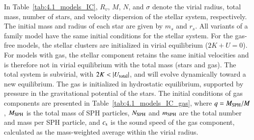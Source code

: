 In Table~\ref{tab:4.1_models_IC}, $R_v$, $M$, $N$, and $\sigma$ denote the virial radius, total mass, number of stars, and velocity dispersion of the stellar system, respectively. The initial mass and radius of each star are given by $m_s$ and $r_s$. All variants of a family model have the same initial conditions for the stellar system. For the gas-free models, the stellar clusters are initialized in virial equilibrium ($2K + U = 0$). For models with gas, the stellar component retains the same initial velocities and is therefore not in virial equilibrium with the total mass (stars and gas). The total system is subvirial, with $2K<|U_{\rm total}|$, and will evolve dynamically toward a new equilibrium. The gas is initialized in hydrostatic equilibrium, supported by pressure in the gravitational potential of the stars. The initial conditions of gas components are presented in Table~\ref{tab:4.1_models_IC_gas}, where $q=M_{\rm SPH}/M$, $M_{\rm SPH}$ is the total mass of SPH particles, $N_{\rm SPH}$ and $m_{\rm SPH}$ are the total number and mass per SPH particle, and $c_{\rm s}$ is the sound speed of the gas component, calculated as the mass-weighted average within the virial radius.


